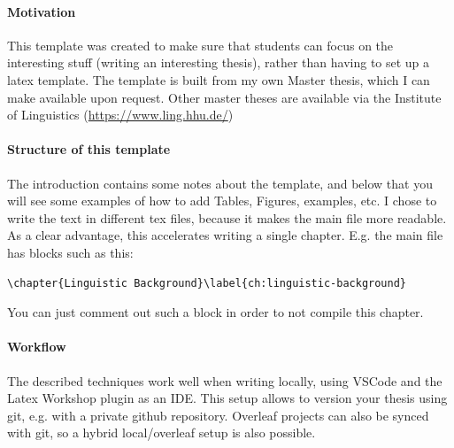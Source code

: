 

\paragraph{Motivation} 
This template was created to make sure that students can focus on the interesting stuff (writing an interesting thesis), rather than having to set up a latex template. 
The template is built from my own Master thesis, which I can make available upon request. Other master theses are available via the Institute of Linguistics (\url{https://www.ling.hhu.de/})



\paragraph{Structure of this template} 
The introduction contains some notes about the template, and below that you will see some examples of how to add Tables, Figures, examples, etc.
I chose to write the text in different tex files, because it makes the main file more readable. As a clear advantage, this accelerates writing a single chapter. E.g. the main file has blocks such as this:  

\begin{verbatim}
\chapter{Linguistic Background}\label{ch:linguistic-background}

\end{verbatim}

You can just comment out such a block in order to not compile this chapter. 

\paragraph{Workflow}
The described techniques work well when writing locally, using VSCode and the Latex Workshop plugin as an IDE. 
This setup allows to version your thesis using git, e.g. with a private github repository. Overleaf projects can also be synced with git, so a hybrid local/overleaf setup is also possible. 

